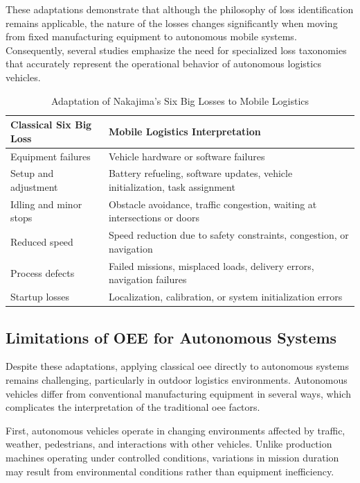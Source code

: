 These adaptations demonstrate that although the philosophy of loss identification remains applicable, the nature of the losses changes significantly when moving from fixed manufacturing equipment to autonomous mobile systems. Consequently, several studies emphasize the need for specialized loss taxonomies that accurately represent the operational behavior of autonomous logistics vehicles.
\begin{table}[!ht]
\renewcommand{\arraystretch}{1.5}
\centering
\caption{Adaptation of Nakajima's Six Big Losses to Mobile Logistics}
\label{tab:mobile-logistics-losses}
\begin{tabular}{|p{5cm}|p{9cm}|}
\hline
\textbf{Classical Six Big Loss} & \textbf{Mobile Logistics Interpretation} \\
\hline
Equipment failures & Vehicle hardware or software failures \\
\hline
Setup and adjustment & Battery refueling, software updates, vehicle initialization, task assignment \\
\hline
Idling and minor stops & Obstacle avoidance, traffic congestion, waiting at intersections or doors \\
\hline
Reduced speed & Speed reduction due to safety constraints, congestion, or navigation \\
\hline
Process defects & Failed missions, misplaced loads, delivery errors, navigation failures \\
\hline
Startup losses & Localization, calibration, or system initialization errors \\
\hline
\end{tabular}
\end{table}
\subsection{Limitations of OEE for Autonomous Systems}

Despite these adaptations, applying classical \gls{oee} directly to autonomous systems remains challenging, particularly in outdoor logistics environments. Autonomous vehicles differ from conventional manufacturing equipment in several ways, which complicates the interpretation of the traditional \gls{oee} factors.

First, autonomous vehicles operate in changing environments affected by traffic, weather, pedestrians, and interactions with other vehicles. Unlike production machines operating under controlled conditions, variations in mission duration may result from environmental conditions rather than equipment inefficiency.

